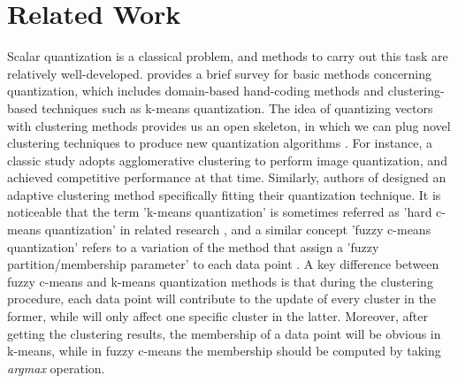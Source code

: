 \documentclass[preprint,10pt]{elsarticle}
\begin{document}
\section{Related Work}
Scalar quantization is a classical problem, and methods to carry out this task are relatively well-developed. \cite{EfficientProcessingDL_Tutorial} provides a brief survey for basic methods concerning quantization, which includes domain-based hand-coding methods and clustering-based techniques such as k-means quantization. The idea of quantizing vectors with clustering methods provides us an open skeleton, in which we can plug novel clustering techniques to produce new quantization algorithms \cite{EmbeddedDeepLearningThesis}. For instance, a classic study \cite{xiang1994color} adopts agglomerative clustering to perform image quantization, and achieved competitive performance at that time. Similarly, authors of \cite{hsieh2000adaptive} designed an adaptive clustering method specifically fitting their quantization technique. It is noticeable that the term 'k-means quantization' is sometimes referred as 'hard c-means quantization' in related research \cite{wen2011hard}, and a similar concept 'fuzzy c-means quantization' refers to a variation of the method that assign a 'fuzzy partition/membership parameter' to each data point \cite{le2011fast}. A key difference between fuzzy c-means and k-means quantization methods is that during the clustering procedure, each data point will contribute to the update of every cluster in the former, while will only affect one specific cluster in the latter. Moreover, after getting the clustering results, the membership of a data point will be obvious in k-means, while in fuzzy c-means the membership should be computed by taking \textit{argmax} operation. \par 
\end{document}
